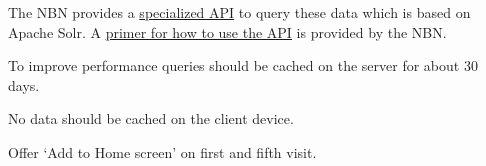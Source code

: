\documentclass[a4paper,12pt,landscape]{article}
\begin{document}
\begin{multicols*}{2}
  The NBN provides a \href{https://api.nbnatlas.org/}{specialized API}
  to query these data which is based on Apache Solr.
  A \href{http://docs.shropshirebotany.org.uk/NBN%20Atlas%20Query%20Primer.pdf}{primer for how to use the API}
  is provided by the NBN.

  \begin{todolist}
    \item To improve performance queries should be cached on the server for about 30 days.
    \item No data should be cached on the client device.
    \item Offer `Add to Home screen' on first and fifth visit.
  \end{todolist}

\end{multicols*}
\end{document}

